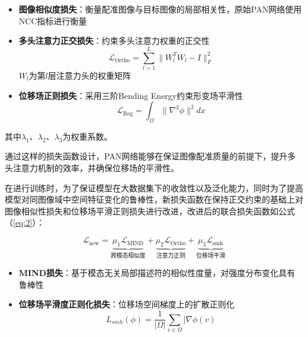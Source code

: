 \begin{itemize}
    \item \textbf{图像相似度损失}：衡量配准图像与目标图像的局部相关性，原始PAN网络使用NCC指标进行衡量

    \item \textbf{多头注意力正交损失}：约束多头注意力权重的正交性
          \begin{equation}
              \mathcal{L}_{\text{Ortho}} = \sum_{l=1}^L \|W_l^T W_l - I\|_F^2
          \end{equation}
          $W_l$为第$l$层注意力头的权重矩阵

    \item \textbf{位移场正则损失}：采用三阶Bending Energy约束形变场平滑性
          \begin{equation}
              \mathcal{L}_{\text{Reg}} = \int_\Omega \|\nabla^3 \phi\|^2 dx
          \end{equation}
\end{itemize}

其中$\lambda_1$、$\lambda_2$、$\lambda_3$为权重系数。

通过这样的损失函数设计，PAN网络能够在保证图像配准质量的前提下，提升多头注意力机制的效率，并确保位移场的平滑性。


在进行训练时，为了保证模型在大数据集下的收敛性以及泛化能力，同时为了提高模型对同图像域中空间特征变化的鲁棒性，新损失函数在保持正交约束的基础上对图像相似性损失和位移场平滑正则损失进行改进，改进后的联合损失函数如公式（\ref{eq:2}）：

\begin{equation}
    \mathcal{L}_{\text{new}} = \underbrace{\mu_1 \mathcal{L}_{\text{MIND}}}_{\text{跨模态相似度}} + \underbrace{\mu_2 \mathcal{L}_{\text{Ortho}}}_{\text{注意力正则}} + \underbrace{\mu_3 \mathcal{L}_{\text{smh}}}_{\text{位移场平滑}}
    \label{eq:2}
\end{equation}

\begin{itemize}
    \item \textbf{MIND损失}：基于模态无关局部描述符的相似性度量，对强度分布变化具有鲁棒性

    \item \textbf{位移场平滑度正则化损失}：位移场空间梯度上的扩散正则化
          \begin{equation}
              L_{smh}(\phi)=\frac{1}{|\Omega|}\sum_{v\in\Omega}|\nabla \phi(v)
          \end{equation}
          
\end{itemize}

